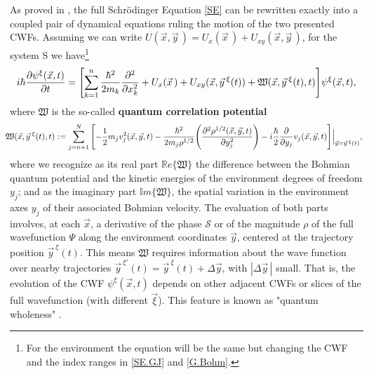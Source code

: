 \documentclass[11pt, a4paper]{article} %
\newcommand{\R}{\mathbb{R}} %
\begin{document}
As proved in \cite{GJ}, the full Schrödinger Equation \eqref{SE} can be rewritten exactly into a coupled pair of dynamical equations ruling the motion of the two presented CWFs. Assuming we can write $U(\vec{x},\vec{y}\,)=U_x(\vec{x}\,)+U_{xy}(\vec{x},\vec{y}\,)$, for the system S we have\footnote{ For the environment the equation will be the same but changing the CWF and the index ranges in \eqref{SE.GJ} and \eqref{G.Bohm}.}\vspace{-0.1cm}
\begin{equation}\label{SE.GJ}
i \hbar \pdv{\psi^\xi (\vec{x},t)}{t} = \qty[\sum_{k=1}^n\frac{\hbar^2}{2m_k} \pdv[2]{}{x_k} + U_x(\vec{x}\,)+ U_{xy}(\vec{x}, \vec{y}^{\: \xi}(t)) + \mathfrak{W}(\vec{x}, \vec{y}^{\: \xi}(t),t)] \psi^\xi (\vec{x},t),
\end{equation}
where $\mathfrak{W}$ is the so-called {\bf quantum correlation potential}
\begin{equation}\label{G.Bohm}\hspace{-0.2cm}
\mathfrak{W}(\vec{x},\vec{y}^{\:\xi}(t),t):=\sum_{j=n+1}^N\qty[-\frac{1}{2}m_jv_j^2(\vec{x},\vec{y},t)-\frac{\hbar^2}{2m_j\rho^{1/2}}\qty(\pdv[2]{\rho^{1/2}(\vec{x},\vec{y},t)}{y_j}) -i\frac{\hbar}{2}\pdv{}{y_j}v_j(\vec{x},\vec{y},t)]\Big\rvert_{\vec{y}=\vec{y}^{\:\xi}(t)},\vspace{-0.1cm}
\end{equation}
where we recognize as its real part $\R e\{\mathfrak{W}\}$ the difference between the Bohmian quantum potential \cite{JordiXavier, Durr} and the kinetic energies of the environment degrees of freedom $y_j$; and as the imaginary part $\mathbb{I}m\{\mathfrak{W}\}$, the spatial variation in the environment axes $y_j$ of their associated Bohmian velocity. The evaluation of both parts involves, at each $\vec{x}$, a derivative of the phase $\mathcal{S}$ or of the magnitude $\rho$ of the full wavefunction $\Psi$ along the environment coordinates $\vec{y}$, centered at the trajectory position $\vec{y}^{\:\xi}(t)$. This means $\mathfrak{W}$ requires information about the wave function over nearby trajectories $\vec{y}^{\:\xi'}(t)=\vec{y}^{\:\xi}(t)+\Delta \vec y$, with $|\Delta\vec y\, |$ small. That is, the evolution of the CWF $\psi^\xi (\vec{x},t)$ depends on other adjacent CWFs or slices of the full wavefunction (with different $\vec{\xi}$). This feature is known as "quantum wholeness" \cite{JordiXavier}.
\end{document}
